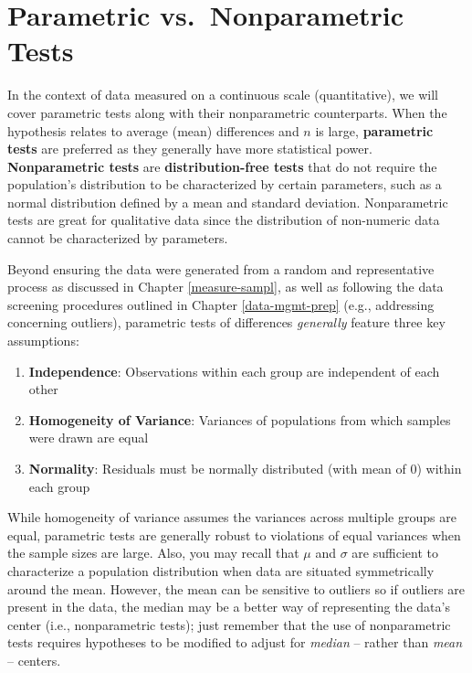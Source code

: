 \documentclass[
]{book}
\providecommand{\tightlist}{%
  \setlength{\itemsep}{0pt}\setlength{\parskip}{0pt}}
\begin{document}
\hypertarget{parametric-vs.-nonparametric-tests}{%
\section{Parametric vs.~Nonparametric Tests}\label{parametric-vs.-nonparametric-tests}}

In the context of data measured on a continuous scale (quantitative), we will cover parametric tests along with their nonparametric counterparts. When the hypothesis relates to average (mean) differences and \(n\) is large, \textbf{parametric tests} are preferred as they generally have more statistical power. \textbf{Nonparametric tests} are \textbf{distribution-free tests} that do not require the population's distribution to be characterized by certain parameters, such as a normal distribution defined by a mean and standard deviation. Nonparametric tests are great for qualitative data since the distribution of non-numeric data cannot be characterized by parameters.

Beyond ensuring the data were generated from a random and representative process as discussed in Chapter \ref{measure-sampl}, as well as following the data screening procedures outlined in Chapter \ref{data-mgmt-prep} (e.g., addressing concerning outliers), parametric tests of differences \emph{generally} feature three key assumptions:

\begin{enumerate}
\def\labelenumi{\arabic{enumi}.}
\tightlist
\item
  \textbf{Independence}: Observations within each group are independent of each other
\item
  \textbf{Homogeneity of Variance}: Variances of populations from which samples were drawn are equal
\item
  \textbf{Normality}: Residuals must be normally distributed (with mean of 0) within each group
\end{enumerate}

While homogeneity of variance assumes the variances across multiple groups are equal, parametric tests are generally robust to violations of equal variances when the sample sizes are large. Also, you may recall that \(\mu\) and \(\sigma\) are sufficient to characterize a population distribution when data are situated symmetrically around the mean. However, the mean can be sensitive to outliers so if outliers are present in the data, the median may be a better way of representing the data's center (i.e., nonparametric tests); just remember that the use of nonparametric tests requires hypotheses to be modified to adjust for \emph{median} -- rather than \emph{mean} -- centers.
\end{document}
